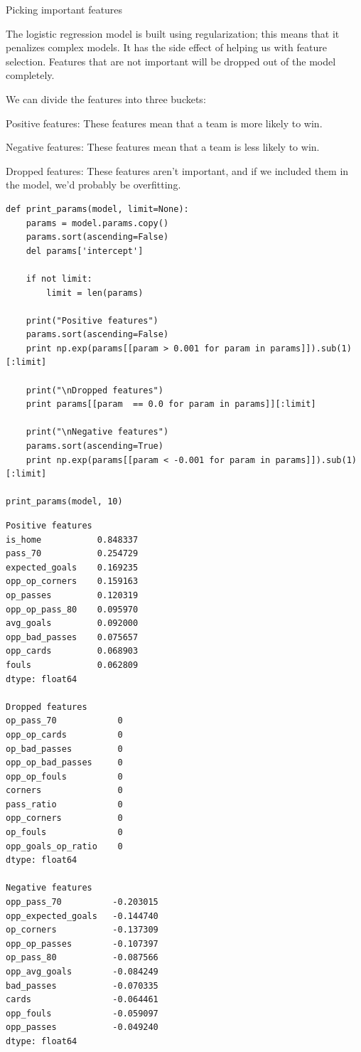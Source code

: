 \documentclass[12pt,fleqn]{article}\usepackage{common}
\begin{document}
Picking important features

The logistic regression model is built using regularization; this means
that it penalizes complex models. It has the side effect of helping us with
feature selection. Features that are not important will be dropped out of
the model completely.

We can divide the features into three buckets:

Positive features: These features mean that a team is more likely to win.

Negative features: These features mean that a team is less likely to win. 

Dropped features: These features aren't important, and if we included them
in the model, we'd probably be overfitting. 

\begin{verbatim}
def print_params(model, limit=None):    
    params = model.params.copy()
    params.sort(ascending=False)
    del params['intercept']
    
    if not limit:
        limit = len(params)

    print("Positive features")
    params.sort(ascending=False)
    print np.exp(params[[param > 0.001 for param in params]]).sub(1)[:limit]

    print("\nDropped features")
    print params[[param  == 0.0 for param in params]][:limit]

    print("\nNegative features")
    params.sort(ascending=True)
    print np.exp(params[[param < -0.001 for param in params]]).sub(1)[:limit]

print_params(model, 10)
\end{verbatim}

\begin{verbatim}
Positive features
is_home           0.848337
pass_70           0.254729
expected_goals    0.169235
opp_op_corners    0.159163
op_passes         0.120319
opp_op_pass_80    0.095970
avg_goals         0.092000
opp_bad_passes    0.075657
opp_cards         0.068903
fouls             0.062809
dtype: float64

Dropped features
op_pass_70            0
opp_op_cards          0
op_bad_passes         0
opp_op_bad_passes     0
opp_op_fouls          0
corners               0
pass_ratio            0
opp_corners           0
op_fouls              0
opp_goals_op_ratio    0
dtype: float64

Negative features
opp_pass_70          -0.203015
opp_expected_goals   -0.144740
op_corners           -0.137309
opp_op_passes        -0.107397
op_pass_80           -0.087566
opp_avg_goals        -0.084249
bad_passes           -0.070335
cards                -0.064461
opp_fouls            -0.059097
opp_passes           -0.049240
dtype: float64
\end{verbatim}
\end{document}
